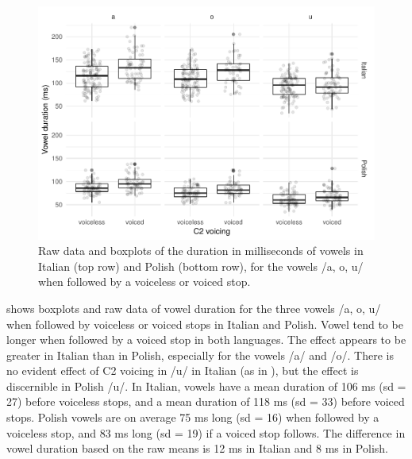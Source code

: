 \documentclass[preprint]{JASAnew}
\begin{document}
\label{s:vduration}

\begin{figure}
\includegraphics[width=\linewidth]{Figure2} \caption{Raw data and boxplots of the duration in milliseconds of vowels in Italian (top row) and Polish (bottom row), for the vowels /a, o, u/ when followed by a voiceless or voiced stop.}\label{f:Figure2}
\end{figure}

 shows boxplots and raw data of vowel duration for the
three vowels /a, o, u/ when followed by voiceless or voiced stops in
Italian and Polish. Vowel tend to be longer when followed by a voiced
stop in both languages. The effect appears to be greater in Italian than
in Polish, especially for the vowels /a/ and /o/. There is no evident
effect of C2 voicing in /u/ in Italian (as in \citealt{ferrero1978}),
but the effect is discernible in Polish /u/. In Italian, vowels have a
mean duration of 106 ms (sd = 27) before voiceless stops, and a mean
duration of 118 ms (sd = 33) before voiced stops. Polish vowels are on
average 75 ms long (sd = 16) when followed by a voiceless stop, and 83
ms long (sd = 19) if a voiced stop follows. The difference in vowel
duration based on the raw means is 12 ms in Italian and 8 ms in Polish.
\end{document}
